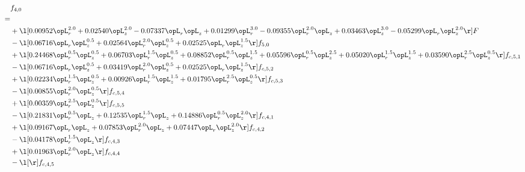 \begin{alignat}{2} 
\label{eq:f_40_2} 
& f_{4,0} \nonumber \\ 
 = \\ 
& + \l[  0.00952 \opL_r^{2.0} +  0.02540 \opL_z^{2.0}   -0.07337 \opL_r \opL_z +  0.01299 \opL_r^{3.0}   -0.09355 \opL_r^{2.0} \opL_z +  0.03463 \opL_z^{3.0}   -0.05299 \opL_r \opL_z^{2.0}  \r] F \nonumber \\ 
& - \l[  0.06716 \opL_r \opL_z^{0.5} +  0.02564 \opL_r^{2.0} \opL_z^{0.5} +  0.02525 \opL_r \opL_z^{1.5}  \r] f_{5,0} \nonumber \\ 
& + \l[  0.24468 \opL_r^{0.5} \opL_z^{0.5} +  0.06703 \opL_r^{1.5} \opL_z^{0.5} +  0.08852 \opL_r^{0.5} \opL_z^{1.5} +  0.05596 \opL_r^{0.5} \opL_z^{2.5} +  0.05020 \opL_r^{1.5} \opL_z^{1.5} +  0.03590 \opL_r^{2.5} \opL_z^{0.5}  \r] f_{c,5,1} \nonumber \\ 
& - \l[  0.06716 \opL_r \opL_z^{0.5} +  0.03419 \opL_r^{2.0} \opL_z^{0.5} +  0.02525 \opL_r \opL_z^{1.5}  \r] f_{c,5,2} \nonumber \\ 
& + \l[  0.02234 \opL_r^{1.5} \opL_z^{0.5} +  0.00926 \opL_r^{1.5} \opL_z^{1.5} +  0.01795 \opL_r^{2.5} \opL_z^{0.5}  \r] f_{c,5,3} \nonumber \\ 
& - \l[  0.00855 \opL_r^{2.0} \opL_z^{0.5}  \r] f_{c,5,4} \nonumber \\ 
& + \l[  0.00359 \opL_r^{2.5} \opL_z^{0.5}  \r] f_{c,5,5} \nonumber \\ 
& - \l[  0.21831 \opL_r^{0.5} \opL_z +  0.12535 \opL_r^{1.5} \opL_z +  0.14886 \opL_r^{0.5} \opL_z^{2.0}  \r] f_{c,4,1} \nonumber \\ 
& + \l[  0.09167 \opL_r \opL_z +  0.07853 \opL_r^{2.0} \opL_z +  0.07447 \opL_r \opL_z^{2.0}  \r] f_{c,4,2} \nonumber \\ 
& - \l[  0.04178 \opL_r^{1.5} \opL_z  \r] f_{c,4,3} \nonumber \\ 
& + \l[  0.01963 \opL_r^{2.0} \opL_z  \r] f_{c,4,4} \nonumber \\ 
& - \l[  \r] f_{c,4,5} \nonumber \\ 
\end{alignat} 



